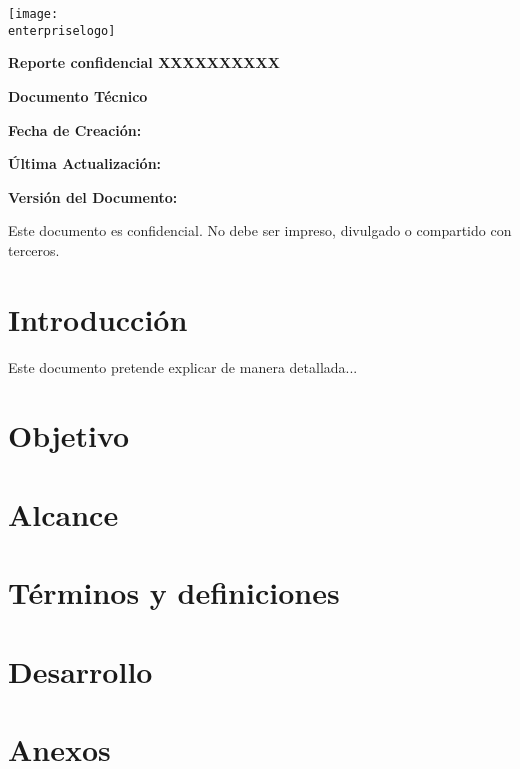 \documentclass[11pt,a4paper]{article}
\newcommand{\enterpriselogo}{images/logo.png}
\begin{document}
\begin{titlepage}
    \centering
    \texttt{[image: \\enterpriselogo]}
    \par
    \vfill
		{\LARGE\bfseries Reporte confidencial XXXXXXXXXX} %
    \par\vspace{0.5cm}
    {\Large\bfseries Documento Técnico} %
    \vfill
    \begin{flushright}
        {\large {\bfseries Fecha de Creación:} \gitcreated}\par\vspace{0.2cm}
        {\large {\bfseries Última Actualización:} \gitdate{}}\par\vspace{0.3cm}
        {\large {\bfseries Versión del Documento:} \gitversion{}}
    \end{flushright}
  \vfill
  Este documento es confidencial.
  No debe ser impreso, divulgado o compartido con terceros.
\end{titlepage}

\tableofcontents
\newpage
{}


\section{Introducción}
Este documento pretende explicar de manera detallada...

\section{Objetivo}

\section{Alcance}

\section{Términos y definiciones}

\section{Desarrollo}

\section{Anexos}

\end{document}
